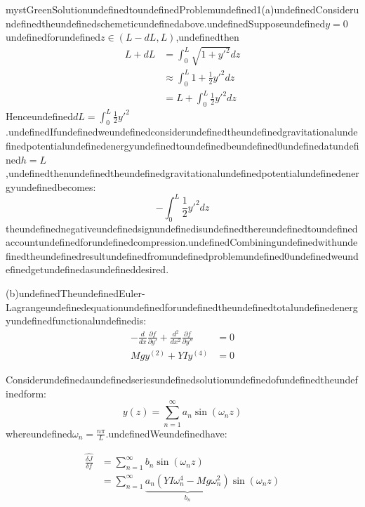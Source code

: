 \begin{mystadmonition}{mystGreen}{SolutionundefinedtoundefinedProblemundefined1}(a)undefinedConsiderundefinedtheundefinedschemeticundefinedabove.undefinedSupposeundefined$y=0$undefinedforundefined$z\in (L -dL,L)$,undefinedthen
\begin{equation}
\begin{aligned}
L+dL&=\int_0^L \sqrt{1+y'^2}dz \\ 
&\approx \int_0^L 1 + \frac{1}{2}y'^2dz\\
&= L + \int_0^L \frac{1}{2}y'^2dz
\end{aligned}
\end{equation}
Henceundefined$dL=\int_0^L \frac{1}{2}y'^2$.undefinedIfundefinedweundefinedconsiderundefinedtheundefinedgravitationalundefinedpotentialundefinedenergyundefinedtoundefinedbeundefined0undefinedatundefined$h=L$,undefinedthenundefinedtheundefinedgravitationalundefinedpotentialundefinedenergyundefinedbecomes:
\begin{equation}
-\int_0^L \frac{1}{2}y'^2dz
\end{equation}
theundefinednegativeundefinedsignundefinedisundefinedthereundefinedtoundefinedaccountundefinedforundefinedcompression.undefinedCombiningundefinedwithundefinedtheundefinedresultundefinedfromundefinedproblemundefined0undefinedweundefinedgetundefinedasundefineddesired.

(b)undefinedTheundefinedEuler-Lagrangeundefinedequationundefinedforundefinedtheundefinedtotalundefinedenergyundefinedfunctionalundefinedis:
\begin{equation}
\begin{aligned}
-\frac{d}{dx}\frac{\partial f}{\partial y'}+\frac{d^2}{dx^2}\frac{\partial f}{\partial y''} &= 0 \\
Mgy^{(2)}+YIy^{(4)} &= 0
\end{aligned}
\end{equation}

Considerundefinedaundefinedseriesundefinedsolutionundefinedofundefinedtheundefinedform:
\begin{equation}
y(z)=\sum_{n=1}^{\infty} a_n\sin(\omega_n z)
\end{equation}
whereundefined$\omega_n = \frac{n\pi}{L}$.undefinedWeundefinedhave:

\begin{equation}
\begin{aligned}
\widehat{\frac{\delta J}{\delta f}} &= \sum_{n=1}^{\infty}  b_n \sin(\omega_n z) \\
&= \sum_{n=1}^{\infty}\underbrace{a_n(YI\omega_n^4-Mg\omega_n^2)}_{b_n}\sin(\omega_n z)
\end{aligned}
\end{equation}


\end{mystadmonition}
